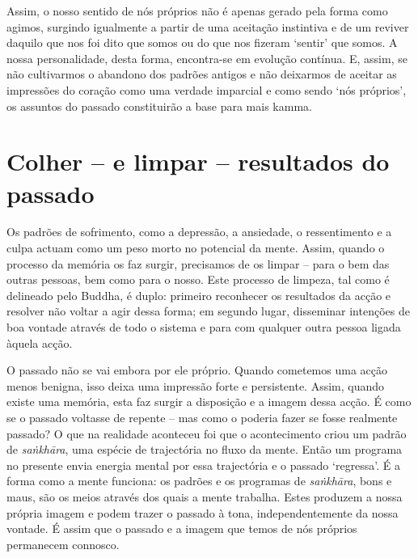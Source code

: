 Assim, o nosso sentido de nós próprios não é apenas gerado pela forma como
agimos, surgindo igualmente a partir de uma aceitação instintiva e de um reviver
daquilo que nos foi dito que somos ou do que nos fizeram `sentir' que somos. A
nossa personalidade, desta forma, encontra-se em evolução contínua. E, assim, se
não cultivarmos o abandono dos padrões antigos e não deixarmos de aceitar as
impressões do coração como uma verdade imparcial e como sendo `nós próprios', os
assuntos do passado constituirão a base para mais kamma.

\section{Colher -- e limpar -- resultados do passado}

Os padrões de sofrimento, como a depressão, a ansiedade, o ressentimento e a
culpa actuam como um peso morto no potencial da mente. Assim, quando o processo
da memória os faz surgir, precisamos de os limpar -- para o bem das outras
pessoas, bem como para o nosso. Este processo de limpeza, tal como é delineado
pelo Buddha, é duplo: primeiro reconhecer os resultados da acção e resolver não
voltar a agir dessa forma; em segundo lugar, disseminar intenções de boa vontade
através de todo o sistema e para com qualquer outra pessoa ligada àquela acção.

O passado não se vai embora por ele próprio. Quando cometemos uma acção menos
benigna, isso deixa uma impressão forte e persistente. Assim, quando existe uma
memória, esta faz surgir a disposição e a imagem dessa acção. É como se o
passado voltasse de repente -- mas como o poderia fazer se fosse realmente
passado? O que na realidade aconteceu foi que o acontecimento criou um padrão de
\emph{saṅkhāra}, uma espécie de trajectória no fluxo da mente. Então um programa
no presente envia energia mental por essa trajectória e o passado `regressa'. É
a forma como a mente funciona: os padrões e os programas de \emph{saṅkhāra},
bons e maus, são os meios através dos quais a mente trabalha. Estes produzem a
nossa própria imagem e podem trazer o passado à tona, independentemente da nossa
vontade. É assim que o passado e a imagem que temos de nós próprios permanecem
connosco.

